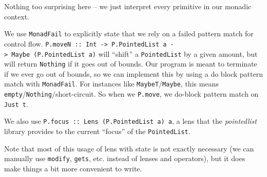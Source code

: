 \documentclass[]{article}
\newenvironment{Shaded}{}{}
\newcommand{\CommentTok}[1]{\textcolor[rgb]{0.38,0.63,0.69}{\textit{#1}}}
\newcommand{\DataTypeTok}[1]{\textcolor[rgb]{0.56,0.13,0.00}{#1}}
\newcommand{\DecValTok}[1]{\textcolor[rgb]{0.25,0.63,0.44}{#1}}
\newcommand{\FunctionTok}[1]{\textcolor[rgb]{0.02,0.16,0.49}{#1}}
\newcommand{\KeywordTok}[1]{\textcolor[rgb]{0.00,0.44,0.13}{\textbf{#1}}}
\newcommand{\NormalTok}[1]{#1}
\newcommand{\OtherTok}[1]{\textcolor[rgb]{0.00,0.44,0.13}{#1}}
\begin{document}
\begin{Shaded}
\end{Shaded}

Nothing too surprising here -- we just interpret every primitive in our monadic
context.

We use \texttt{MonadFail} to explicitly state that we rely on a failed pattern
match for control flow.
\texttt{P.moveN\ ::\ Int\ -\textgreater{}\ P.PointedList\ a\ -\textgreater{}\ Maybe\ (P.PointedList\ a)}
will ``shift'' a \texttt{PointedList} by a given amount, but will return
\texttt{Nothing} if it goes out of bounds. Our program is meant to terminate if
we ever go out of bounds, so we can implement this by using a do block pattern
match with \texttt{MonadFail}. For instances like
\texttt{MaybeT}/\texttt{Maybe}, this means
\texttt{empty}/\texttt{Nothing}/short-circuit. So when we \texttt{P.move}, we
do-block pattern match on \texttt{Just\ t\textquotesingle{}}.

We also use \texttt{P.focus\ ::\ Lens\textquotesingle{}\ (P.PointedList\ a)\ a},
a lens that the \emph{pointedlist} library provides to the current ``focus'' of
the \texttt{PointedList}.

Note that most of this usage of lens with state is not exactly necessary (we can
manually use \texttt{modify}, \texttt{gets}, etc. instead of lenses and
operators), but it does make things a bit more convenient to write.
\end{document}
